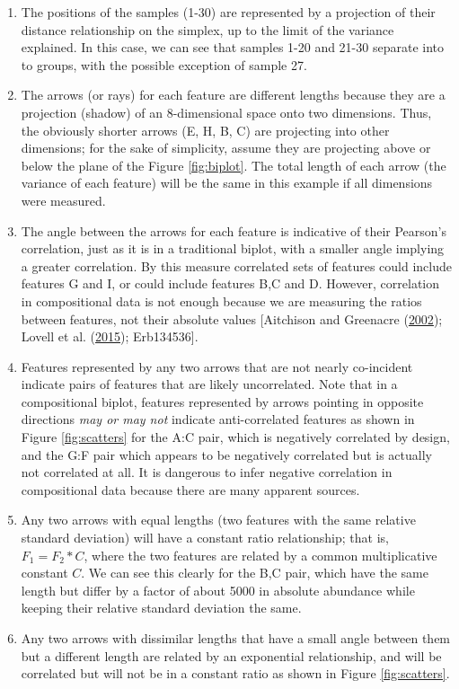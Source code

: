 \documentclass[onecolumn]{book}
\theoremstyle{definition}
\theoremstyle{definition}
\theoremstyle{definition}
\theoremstyle{remark}
\begin{document}
\begin{enumerate}
\def\labelenumi{\arabic{enumi}.}
\item
  The positions of the samples (1-30) are represented by a projection of
  their distance relationship on the simplex, up to the limit of the
  variance explained. In this case, we can see that samples 1-20 and
  21-30 separate into to groups, with the possible exception of sample
  27.
\item
  The arrows (or rays) for each feature are different lengths because
  they are a projection (shadow) of an 8-dimensional space onto two
  dimensions. Thus, the obviously shorter arrows (E, H, B, C) are
  projecting into other dimensions; for the sake of simplicity, assume
  they are projecting above or below the plane of the Figure
  \ref{fig:biplot}. The total length of each arrow (the variance of each
  feature) will be the same in this example if all dimensions were
  measured.
\item
  The angle between the arrows for each feature is indicative of their
  Pearson's correlation, just as it is in a traditional biplot, with a
  smaller angle implying a greater correlation. By this measure
  correlated sets of features could include features G and I, or could
  include features B,C and D. However, correlation in compositional data
  is not enough because we are measuring the ratios between features,
  not their absolute values {[}Aitchison and Greenacre
  (\protect\hyperlink{ref-aitchison2002biplots}{2002}); Lovell et al.
  (\protect\hyperlink{ref-Lovell:2015}{2015}); Erb134536{]}.
\item
  Features represented by any two arrows that are not nearly co-incident
  indicate pairs of features that are likely uncorrelated. Note that in
  a compositional biplot, features represented by arrows pointing in
  opposite directions \emph{may or may not} indicate anti-correlated
  features as shown in Figure \ref{fig:scatters} for the A:C pair, which
  is negatively correlated by design, and the G:F pair which appears to
  be negatively correlated but is actually not correlated at all. It is
  dangerous to infer negative correlation in compositional data because
  there are many apparent sources.
\item
  Any two arrows with equal lengths (two features with the same relative
  standard deviation) will have a constant ratio relationship; that is,
  \(F_1 = F_2 * C\), where the two features are related by a common
  multiplicative constant \(C\). We can see this clearly for the B,C
  pair, which have the same length but differ by a factor of about 5000
  in absolute abundance while keeping their relative standard deviation
  the same.
\item
  Any two arrows with dissimilar lengths that have a small angle between
  them but a different length are related by an exponential
  relationship, and will be correlated but will not be in a constant
  ratio as shown in Figure \ref{fig:scatters}.
\end{enumerate}
\end{document}
